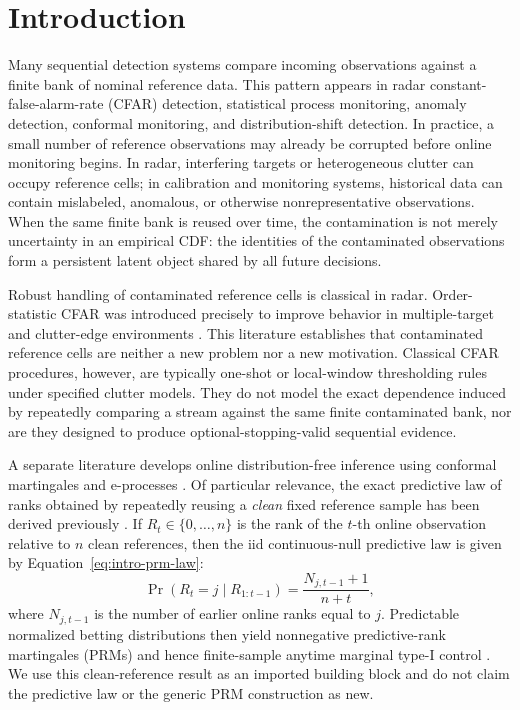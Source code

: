 \section{Introduction}

Many sequential detection systems compare incoming observations against a finite bank of nominal reference data. This pattern appears in radar constant-false-alarm-rate (CFAR) detection, statistical process monitoring, anomaly detection, conformal monitoring, and distribution-shift detection. In practice, a small number of reference observations may already be corrupted before online monitoring begins. In radar, interfering targets or heterogeneous clutter can occupy reference cells; in calibration and monitoring systems, historical data can contain mislabeled, anomalous, or otherwise nonrepresentative observations. When the same finite bank is reused over time, the contamination is not merely uncertainty in an empirical CDF: the identities of the contaminated observations form a persistent latent object shared by all future decisions.

Robust handling of contaminated reference cells is classical in radar. Order-statistic CFAR was introduced precisely to improve behavior in multiple-target and clutter-edge environments \cite{Rohling1983}. This literature establishes that contaminated reference cells are neither a new problem nor a new motivation. Classical CFAR procedures, however, are typically one-shot or local-window thresholding rules under specified clutter models. They do not model the exact dependence induced by repeatedly comparing a stream against the same finite contaminated bank, nor are they designed to produce optional-stopping-valid sequential evidence.

A separate literature develops online distribution-free inference using conformal martingales and e-processes \cite{Vovk2021,VovkEtAl2021,RamdasEtAl2022}. Of particular relevance, the exact predictive law of ranks obtained by repeatedly reusing a \emph{clean} fixed reference sample has been derived previously \cite{KuangXia2026}. If \(R_t\in\{0,\ldots,n\}\) is the rank of the \(t\)-th online observation relative to \(n\) clean references, then the iid continuous-null predictive law is given by Equation~\eqref{eq:intro-prm-law}:
\begin{equation}
  \Pr(R_t=j\mid R_{1:t-1})
  =
  \frac{N_{j,t-1}+1}{n+t},
  \label{eq:intro-prm-law}
\end{equation}
where \(N_{j,t-1}\) is the number of earlier online ranks equal to \(j\). Predictable normalized betting distributions then yield nonnegative predictive-rank martingales (PRMs) and hence finite-sample anytime marginal type-I control \cite{KuangXia2026}. We use this clean-reference result as an imported building block and do not claim the predictive law or the generic PRM construction as new.


